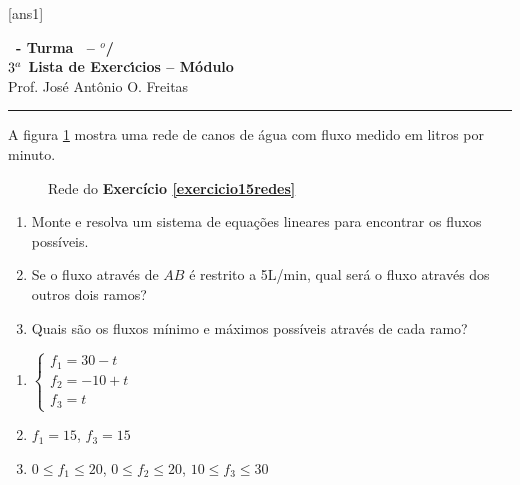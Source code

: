 \documentclass[12pt]{exam}
\begin{document}
  [ans1]
  \begin{center}
    {\Large\bf \disciplina\ - Turma \turma\ -- \semestre$^{o}$/\ano} \\ \vspace{9pt} {\large\bf
        $3^a$ Lista de Exerc{\'\i}cios -- Módulo \numeromodulo}\\ \vspace{9pt} Prof. Jos{\'e} Ant{\^o}nio O. Freitas
  \end{center}
  \hrule


\begin{exercicio}\label{exercicio15redes}
  A figura \ref{exercicio15redespoole} mostra uma rede de canos de água com fluxo medido em litros por minuto.
  \begin{figure}[!h]
    \centering
    
    \caption{Rede do \textbf{Exercício \ref{exercicio15redes}}}
    \label{exercicio15redespoole}
  \end{figure}

  \begin{enumerate}
    \item Monte e resolva um sistema de equações lineares para encontrar os fluxos possíveis.
    \item Se o fluxo através de $AB$ é restrito a 5L/min, qual será o fluxo através dos outros dois ramos?
    \item Quais são os fluxos mínimo e máximos possíveis através de cada ramo?
  \end{enumerate}
  \begin{solucao}
    \begin{enumerate}
      \item $\begin{cases}f_1 = 30 - t\\f_2 = -10 + t\\f_3 = t\end{cases}$
      \item $f_1 = 15$, $f_3 = 15$
      \item $0 \le f_1 \le 20$, $0 \le f_2 \le 20$, $10 \le f_3 \le 30$
    \end{enumerate}
  \end{solucao}
\end{exercicio}
\end{document}
